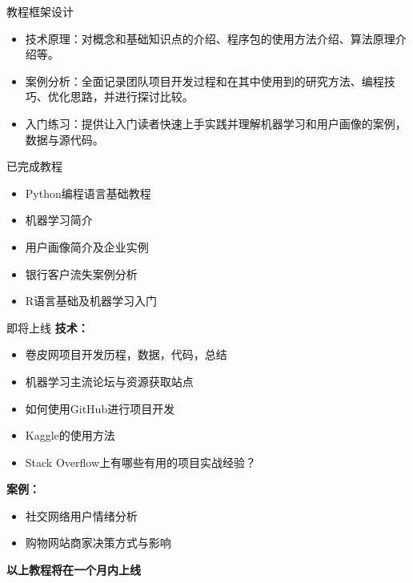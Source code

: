 \documentclass[10pt, aspectratio=32,handout]{beamer}
\begin{document}
\begin{frame}{教程框架设计}
\begin{itemize}
\item 技术原理：对概念和基础知识点的介绍、程序包的使用方法介绍、算法原理介绍等。\newline
\item 案例分析：全面记录团队项目开发过程和在其中使用到的研究方法、编程技巧、优化思路，并进行探讨比较。\newline
\item 入门练习：提供让入门读者快速上手实践并理解机器学习和用户画像的案例，数据与源代码。\newline
\end{itemize}
\end{frame}

\begin{frame}{已完成教程}
  \begin{itemize}
    \item Python编程语言基础教程\newline
    \item 机器学习简介\newline
    \item 用户画像简介及企业实例\newline
    \item 银行客户流失案例分析\newline
    \item R语言基础及机器学习入门\newline
  \end{itemize}
\end{frame}

\begin{frame}{即将上线}
\textbf{技术：}
  \begin{itemize}
    \item 卷皮网项目开发历程，数据，代码，总结
    \item 机器学习主流论坛与资源获取站点
    \item 如何使用GitHub进行项目开发
    \item Kaggle的使用方法
    \item Stack Overflow上有哪些有用的项目实战经验？\newline
  \end{itemize}
\textbf{案例：}
  \begin{itemize}
  \item 社交网络用户情绪分析
  \item 购物网站商家决策方式与影响\newline
  \end{itemize}
  \textbf{以上教程将在一个月内上线}
\end{frame}
\end{document}
